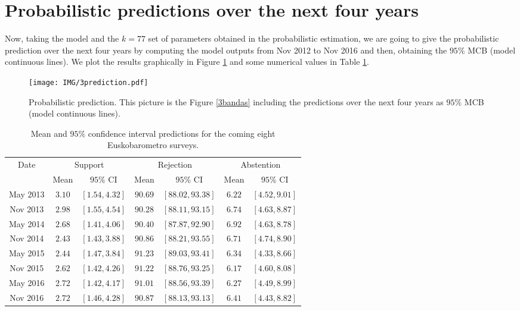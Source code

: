 \section{Probabilistic predictions over the next four years}\label{3.3}
Now, taking the model and the $k=77$ set of parameters obtained in the probabilistic estimation, we are going to give the probabilistic prediction over the next four years by computing the model outputs from Nov 2012 to Nov 2016 and then, obtaining the $95\%$ MCB (model continuous lines). We plot the results graphically in Figure \ref{3bandas2} and some numerical values in Table \ref{c3TABLA3}.

\begin{figure}[h]
 \begin{center}
  \texttt{[image: IMG/3prediction.pdf]}\\
  \caption{Probabilistic prediction. This picture is the  Figure \ref{3bandas} including the predictions over the next four years as $95\%$ MCB (model continuous lines).} \label{3bandas2}
\end{center}
\end{figure} 

\begin{table}[h]
\centering
\begin{small}
\begin{tabular}{|c|c|c|c|c|c|c|}
\hline
Date    & \multicolumn{2}{c|}{Support} & \multicolumn{2}{c|}{Rejection} & \multicolumn{2}{c|}{Abstention} 	\\
		& Mean & $95\%$ CI & Mean & $95\%$ CI & Mean & $95\%$ CI \\
\hline
May 2013 & $  3.10$ & $[  1.54,  4.32]$ & $ 90.69$ & $[ 88.02, 93.38]$ & $  6.22$ & $[  4.52,  9.01]$ \\ 
Nov 2013 & $  2.98$ & $[  1.55,  4.54]$ & $ 90.28$ & $[ 88.11, 93.15]$ & $  6.74$ & $[  4.63,  8.87]$ \\ 
May 2014 & $  2.68$ & $[  1.41,  4.06]$ & $ 90.40$ & $[ 87.87, 92.90]$ & $  6.92$ & $[  4.63,  8.78]$ \\ 
Nov 2014 & $  2.43$ & $[  1.43,  3.88]$ & $ 90.86$ & $[ 88.21, 93.55]$ & $  6.71$ & $[  4.74,  8.90]$ \\ 
May 2015 & $  2.44$ & $[  1.47,  3.84]$ & $ 91.23$ & $[ 89.03, 93.41]$ & $  6.34$ & $[  4.33,  8.66]$ \\ 
Nov 2015 & $  2.62$ & $[  1.42,  4.26]$ & $ 91.22$ & $[ 88.76, 93.25]$ & $  6.17$ & $[  4.60,  8.08]$ \\ 
May 2016 & $  2.72$ & $[  1.42,  4.17]$ & $ 91.01$ & $[ 88.56, 93.39]$ & $  6.27$ & $[  4.49,  8.99]$ \\ 
Nov 2016 & $  2.72$ & $[  1.46,  4.28]$ & $ 90.87$ & $[ 88.13, 93.13]$ & $  6.41$ & $[  4.43,  8.82]$ \\ 
\hline 
\end{tabular} 
\end{small}
\caption{Mean and $95\%$ confidence interval predictions for the coming eight Euskobarometro surveys.}
\label{c3TABLA3} 
\end{table}

